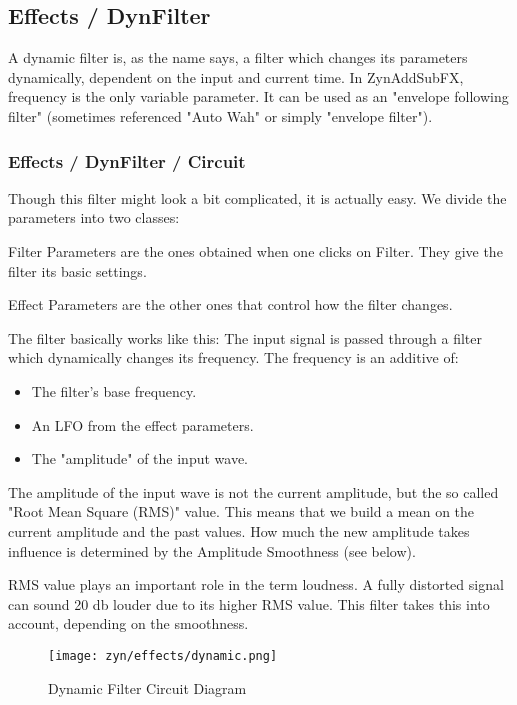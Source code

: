 \subsection{Effects / DynFilter}
\label{subsec:effects_edit_dynfilter}

   A dynamic filter is, as the name says, a filter which changes its
   parameters dynamically, dependent on the input and current time. In
   ZynAddSubFX, frequency is the only variable parameter. It can be used as
   an "envelope following filter" (sometimes referenced "Auto Wah" or simply
   "envelope filter").

\subsubsection{Effects / DynFilter / Circuit}
\label{subsubsec:effects_edit_dynfilter_circuit}

   Though this filter might look a bit complicated, it is actually easy. We
   divide the parameters into two classes:

   Filter Parameters are the ones obtained when one clicks on Filter. They
   give the filter its basic settings.

   Effect Parameters are the other ones that control how the filter changes.

   The filter basically works like this: The input signal is passed through a
   filter which dynamically changes its frequency. The frequency is an
   additive of:

   \begin{itemize}
      \item The filter’s base frequency.
      \item An LFO from the effect parameters.
      \item The "amplitude" of the input wave.
   \end{itemize}

   The amplitude of the input wave is not the current amplitude, but the so
   called "Root Mean Square (RMS)" value. This means that we build a mean on
   the current amplitude and the past values. How much the new amplitude
   takes influence is determined by the Amplitude Smoothness (see below).

   RMS value plays an important role in the term loudness. A fully distorted
   signal can sound 20 db louder due to its higher RMS value. This filter
   takes this into account, depending on the smoothness.

\begin{figure}[H]
   \centering 
   \texttt{[image: zyn/effects/dynamic.png]}
   \caption{Dynamic Filter Circuit Diagram}
   \label{fig:dynfilter_circuit_diagram}
\end{figure}

